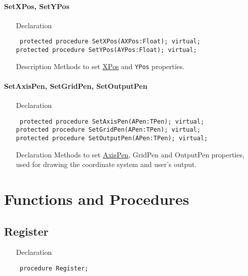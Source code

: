 \documentclass[12pt,a4paper,oneside]{report}
\newcommand{\declarationitem}[1]{{\addfontfeatures{FakeBold=1.3} #1}}
\newcommand{\descriptiontitle}[1]{{\addfontfeatures{FakeSlant}#1}}
\newcommand{\code}[1]{\texttt{#1}}
\begin{document}
\paragraph{SetXPos, SetYPos}\hspace*{\fill}
\label{lmcoordsys.TCoordSys-SetXPos}
\begin{itemize}\item[\declarationitem{Declaration}\hfill]
	\begin{flushleft}
		\code{
			protected procedure SetXPos(AXPos:Float); virtual;\\
			protected procedure SetYPos(AYPos:Float); virtual;}
	\end{flushleft}
	\item[\descriptiontitle{Description}] Methods to set \hyperref[lmcoordsys.TCoordSys-XPos]{XPos} and \code{YPos} properties.
\end{itemize}
\paragraph{SetAxisPen, SetGridPen, SetOutputPen}\hspace*{\fill}
\label{lmcoordsys.TCoordSys-SetAxisPen}
\begin{itemize}\item[\declarationitem{Declaration}\hfill]
	\begin{flushleft}
		\code{
			protected procedure SetAxisPen(APen:TPen); virtual;\\
			protected procedure SetGridPen(APen:TPen); virtual;\\
			protected procedure SetOutputPen(APen:TPen); virtual;}
	\end{flushleft}
	\item[\declarationitem{Declaration}\hfill] Methods to set \hyperref[lmcoordsys.TCoordSys-AxisPen]{AxisPen}, GridPen and OutputPen properties, used for drawing the coordinate system and user's output.
\end{itemize}
\section{Functions and Procedures}
\subsection{Register}
\label{lmcoordsys-Register}
\begin{itemize}\item[\declarationitem{Declaration}\hfill]
\begin{flushleft}
\code{
procedure Register;}

\end{flushleft}

\end{itemize}
\end{document}
